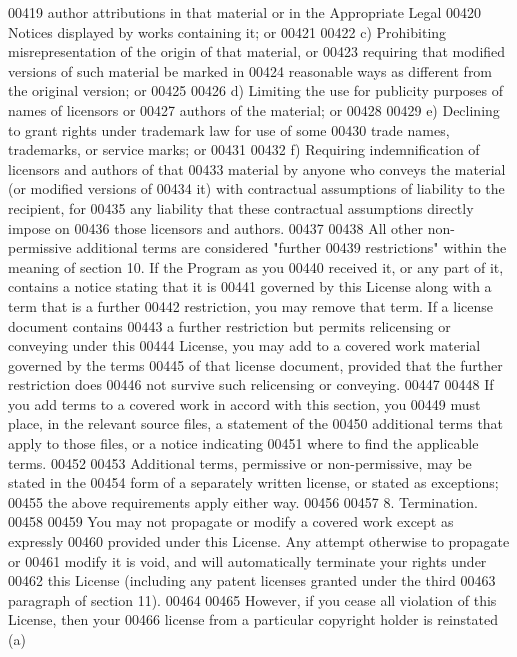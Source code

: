 \begin{DoxyCode}
00419     author attributions in that material or in the Appropriate Legal
00420     Notices displayed by works containing it; or
00421 
00422     c) Prohibiting misrepresentation of the origin of that material, or
00423     requiring that modified versions of such material be marked in
00424     reasonable ways as different from the original version; or
00425 
00426     d) Limiting the use for publicity purposes of names of licensors or
00427     authors of the material; or
00428 
00429     e) Declining to grant rights under trademark law for use of some
00430     trade names, trademarks, or service marks; or
00431 
00432     f) Requiring indemnification of licensors and authors of that
00433     material by anyone who conveys the material (or modified versions of
00434     it) with contractual assumptions of liability to the recipient, for
00435     any liability that these contractual assumptions directly impose on
00436     those licensors and authors.
00437 
00438   All other non-permissive additional terms are considered "further
00439 restrictions" within the meaning of section 10.  If the Program as you
00440 received it, or any part of it, contains a notice stating that it is
00441 governed by this License along with a term that is a further
00442 restriction, you may remove that term.  If a license document contains
00443 a further restriction but permits relicensing or conveying under this
00444 License, you may add to a covered work material governed by the terms
00445 of that license document, provided that the further restriction does
00446 not survive such relicensing or conveying.
00447 
00448   If you add terms to a covered work in accord with this section, you
00449 must place, in the relevant source files, a statement of the
00450 additional terms that apply to those files, or a notice indicating
00451 where to find the applicable terms.
00452 
00453   Additional terms, permissive or non-permissive, may be stated in the
00454 form of a separately written license, or stated as exceptions;
00455 the above requirements apply either way.
00456 
00457   8. Termination.
00458 
00459   You may not propagate or modify a covered work except as expressly
00460 provided under this License.  Any attempt otherwise to propagate or
00461 modify it is void, and will automatically terminate your rights under
00462 this License (including any patent licenses granted under the third
00463 paragraph of section 11).
00464 
00465   However, if you cease all violation of this License, then your
00466 license from a particular copyright holder is reinstated (a)

\end{DoxyCode}
